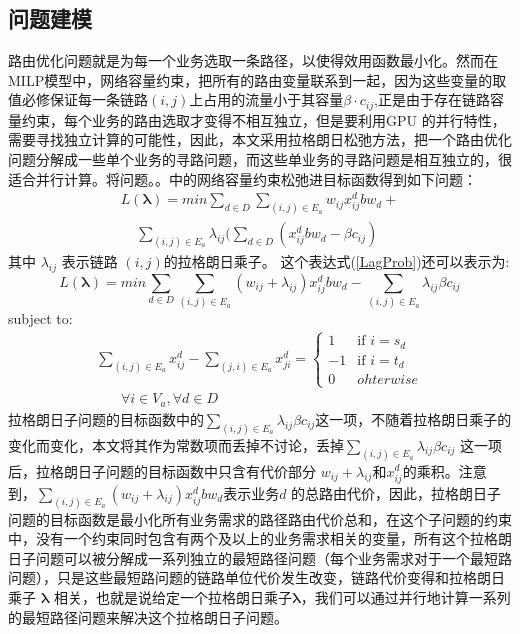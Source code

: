 \subsection{问题建模}
  路由优化问题就是为每一个业务选取一条路径，以使得效用函数最小化。然而在MILP模型中，网络容量约束，把所有的路由变量联系到一起，因为这些变量的取值必修保证每一条链路$(i,j)$上占用的流量小于其容量$\beta\cdot c_{ij}$,正是由于存在链路容量约束，每个业务的路由选取才变得不相互独立，但是要利用GPU 的并行特性，需要寻找独立计算的可能性，因此，本文采用拉格朗日松弛方法，把一个路由优化问题分解成一些单个业务的寻路问题，而这些单业务的寻路问题是相互独立的，很适合并行计算。将问题。。中的网络容量约束松弛进目标函数得到如下问题：
\begin{equation}\label{LagProb}
\begin{split}
L(\mathbf{\lambda})= min\sum\limits_{d \in D}\sum\limits_{(i,j) \in E_a} w_{ij}x_{ij}^d bw_d+ \\ ~~~~~\sum\limits_{(i,j) \in E_a}\lambda_{ij}(\sum\limits_{d \in D} (x_{ij}^d bw_d-\beta c_{ij})
\end{split}
\end{equation}
其中 $\lambda_{ij}$ 表示链路 $(i,j)$的拉格朗日乘子。
这个表达式(\ref{LagProb})还可以表示为:
\begin{equation}\label{Lagprob1}
L(\mathbf{\lambda})= min\sum\limits_{d \in D}\sum\limits_{(i,j) \in E_a} (w_{ij}+\lambda_{ij})x_{ij}^dbw_d -\sum\limits_{(i,j) \in E_a}\lambda_{ij}\beta c_{ij}
\end{equation}
subject to:
\begin{equation}\label{FlowConv2}
\begin{split}
\sum\limits_{(i,j) \in E_a} x_{ij}^d - \sum\limits_{(j,i) \in E_a} x_{ji}^d
=\begin{cases}
1 & \text{if $i = s_d$}\\
-1 & \text{if $i = t_d$} \\
0 &{ohterwise}
\end{cases}
\\~~~~~~~~\forall i\in V_a, \forall d\in D
\end{split}
\end{equation}
 拉格朗日子问题的目标函数中的$\sum_{(i,j) \in E_a}\lambda_{ij}\beta c_{ij}$这一项，不随着拉格朗日乘子的变化而变化，本文将其作为常数项而丢掉不讨论，丢掉$\sum_{(i,j) \in E_a}\lambda_{ij}\beta c_{ij}$ 这一项后，拉格朗日子问题的目标函数中只含有代价部分 $w_{ij}+\lambda_{ij}$和$x_{ij}^d$的乘积。注意到，$\sum_{(i,j) \in E_a} (w_{ij}+\lambda_{ij})x_{ij}^d bw_d$表示业务$d$ 的总路由代价，因此，拉格朗日子问题的目标函数是最小化所有业务需求的路径路由代价总和，在这个子问题的约束中，没有一个约束同时包含有两个及以上的业务需求相关的变量，所有这个拉格朗日子问题可以被分解成一系列独立的最短路径问题（每个业务需求对于一个最短路问题），只是这些最短路问题的链路单位代价发生改变，链路代价变得和拉格朗日乘子 $\mathbf{\lambda}$ 相关，也就是说给定一个拉格朗日乘子$\mathbf{\lambda}$，我们可以通过并行地计算一系列的最短路径问题来解决这个拉格朗日子问题。
